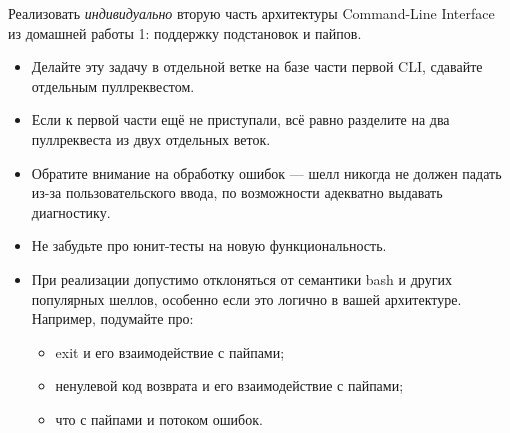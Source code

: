 \documentclass[a5paper]{homework}
\begin{document}

Реализовать \emph{индивидуально} вторую часть архитектуры Command-Line Interface из домашней работы 1: поддержку подстановок и пайпов.

\begin{itemize}
    \item Делайте эту задачу в отдельной ветке на базе части первой CLI, сдавайте отдельным пуллреквестом.
    \item Если к первой части ещё не приступали, всё равно разделите на два пуллреквеста из двух отдельных веток.
    \item Обратите внимание на обработку ошибок --- шелл никогда не должен падать из-за пользовательского ввода, по возможности адекватно выдавать диагностику.
    \item Не забудьте про юнит-тесты на новую функциональность.
    \item При реализации допустимо отклоняться от семантики bash и других популярных шеллов, особенно если это логично в вашей архитектуре. Например, подумайте про:
    \begin{itemize}
        \item exit и его взаимодействие с пайпами;
        \item ненулевой код возврата и его взаимодействие с пайпами;
        \item что с пайпами и потоком ошибок.
    \end{itemize}
\end{itemize}
\end{document}
